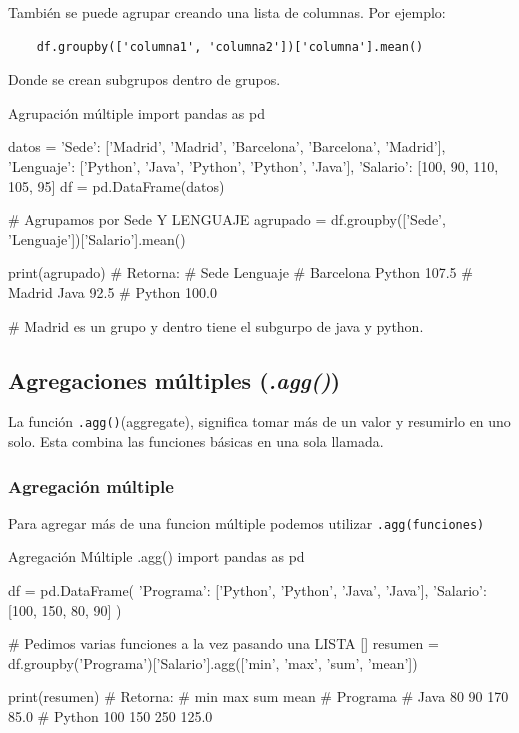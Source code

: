 También se puede agrupar creando una lista de columnas. Por ejemplo:
\begin{verbatim}
    df.groupby(['columna1', 'columna2'])['columna'].mean()
\end{verbatim}
Donde se crean subgrupos dentro de grupos. 
\begin{pycode}{Agrupación múltiple}
import pandas as pd

datos = {
    'Sede': ['Madrid', 'Madrid', 'Barcelona', 'Barcelona', 'Madrid'],
    'Lenguaje': ['Python', 'Java', 'Python', 'Python', 'Java'],
    'Salario': [100, 90, 110, 105, 95]
}
df = pd.DataFrame(datos)

# Agrupamos por Sede Y LENGUAJE
agrupado = df.groupby(['Sede', 'Lenguaje'])['Salario'].mean()

print(agrupado) # Retorna:
# Sede       Lenguaje
# Barcelona  Python      107.5
# Madrid     Java         92.5
#            Python      100.0

# Madrid es un grupo y dentro tiene el subgurpo de java y python.
\end{pycode}




\subsection{Agregaciones múltiples (\textit{.agg()})}

La función \texttt{.agg()}(aggregate), significa tomar más de un valor y resumirlo en uno solo. Esta combina las funciones básicas en una sola llamada.

\subsubsection{Agregación múltiple}

Para agregar más de una funcion múltiple podemos utilizar \texttt{.agg(funciones)}
\begin{pycode}{Agregación Múltiple .agg()}
import pandas as pd

df = pd.DataFrame({
    'Programa': ['Python', 'Python', 'Java', 'Java'],
    'Salario': [100, 150, 80, 90]
})

# Pedimos varias funciones a la vez pasando una LISTA []
resumen = df.groupby('Programa')['Salario'].agg(['min', 'max', 'sum', 'mean'])

print(resumen) # Retorna:
#           min  max  sum   mean
# Programa                      
# Java       80   90  170   85.0
# Python    100  150  250  125.0
\end{pycode}

